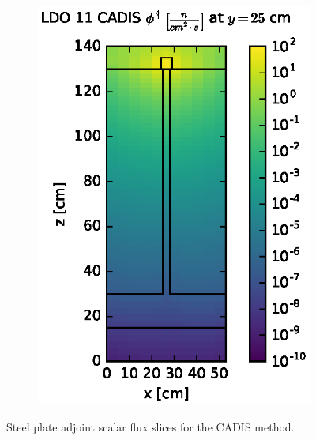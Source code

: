 \begin{figure}[!htb]
\begin{subfigure}{0.4\textwidth}
\includegraphics[max height=0.445\textheight]
{img/steel-plots/cad-adj/flux-ldo11-slice.eps}
\end{subfigure}
\caption{Steel plate adjoint scalar flux slices for the CADIS method.}
\label{steel-cad-adj-slices}
\end{figure}

